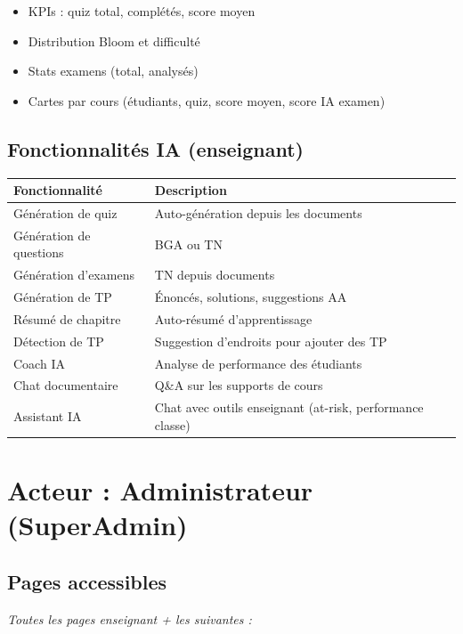 \documentclass[12pt,a4paper]{article}
\begin{document}
\begin{itemize}
    \item KPIs : quiz total, complétés, score moyen
    \item Distribution Bloom et difficulté
    \item Stats examens (total, analysés)
    \item Cartes par cours (étudiants, quiz, score moyen, score IA examen)
\end{itemize}

\subsection{Fonctionnalités IA (enseignant)}

\begin{longtable}{@{}p{4cm}p{10.5cm}@{}}
\toprule
\textbf{Fonctionnalité} & \textbf{Description} \\
\midrule
\endhead
Génération de quiz & Auto-génération depuis les documents \\
Génération de questions & BGA ou TN \\
Génération d'examens & TN depuis documents \\
Génération de TP & Énoncés, solutions, suggestions AA \\
Résumé de chapitre & Auto-résumé d'apprentissage \\
Détection de TP & Suggestion d'endroits pour ajouter des TP \\
Coach IA & Analyse de performance des étudiants \\
Chat documentaire & Q\&A sur les supports de cours \\
Assistant IA & Chat avec outils enseignant (at-risk, performance classe) \\
\bottomrule
\end{longtable}

\section{Acteur : Administrateur (SuperAdmin)}

\subsection{Pages accessibles}
\textit{Toutes les pages enseignant + les suivantes :}
\end{document}
